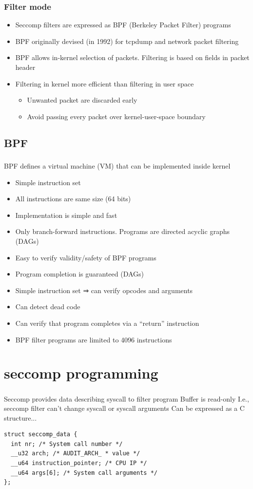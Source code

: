 \documentclass[usenames,dvipsnames]{beamer}
\begin{document}
\begin{frame}
\frametitle{Filter mode}
\begin{itemize}
\item Seccomp filters are expressed as BPF (Berkeley Packet Filter) programs
\item BPF originally devised (in 1992) for tcpdump and network packet filtering
\item BPF allows in-kernel selection of packets. Filtering is based on fields in packet header
\item Filtering in kernel more efficient than filtering in user space
  \begin{itemize}
    \item Unwanted packet are discarded early
    \item Avoid passing every packet over kernel-user-space boundary
  \end{itemize}
\end{itemize}
\end{frame}

\subsection{BPF}
\begin{frame}
\frametitle{\subsecname}
BPF defines a virtual machine (VM) that can be implemented inside kernel
\begin{itemize}
  \item Simple instruction set
  \item All instructions are same size (64 bits)
  \item Implementation is simple and fast
  \item Only branch-forward instructions. Programs are directed acyclic graphs (DAGs)
  \item Easy to verify validity/safety of BPF programs
  \item Program completion is guaranteed (DAGs)
  \item Simple instruction set ⇒ can verify opcodes and arguments
  \item Can detect dead code
  \item Can verify that program completes via a “return” instruction
  \item BPF filter programs are limited to 4096 instructions
\end{itemize}
\end{frame}

\section{seccomp programming}
\begin{frame}[fragile]
\frametitle{\secname}
Seccomp provides data describing syscall to filter program
Buffer is read-only
I.e., seccomp filter can’t change syscall or syscall arguments
Can be expressed as a C structure...
\begin{verbatim}
struct seccomp_data {
  int nr; /* System call number */
  __u32 arch; /* AUDIT_ARCH_ * value */
  __u64 instruction_pointer; /* CPU IP */
  __u64 args[6]; /* System call arguments */
};
\end{verbatim}
\end{frame}
\end{document}
